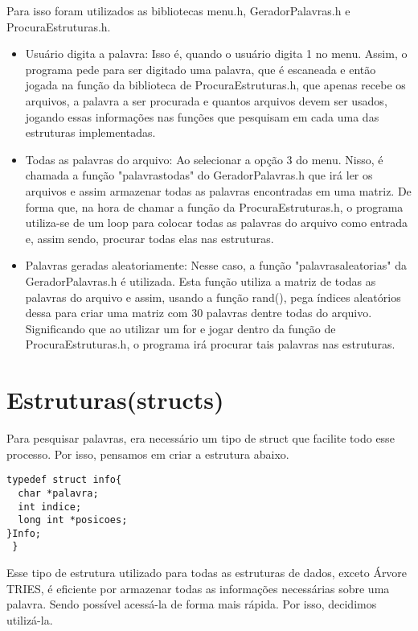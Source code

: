 \documentclass[
	12pt,				%
    oneside,			%
	a4paper,			%
	english,			%
	french,				%
	spanish,			%
	brazil,				%
	]{abntex2}
\begin{document}
Para isso foram utilizados as bibliotecas menu.h, GeradorPalavras.h e ProcuraEstruturas.h.

\begin{itemize}
   \item Usuário digita a palavra: Isso é, quando o usuário digita 1 no menu. Assim, o programa pede para ser digitado uma palavra, que é escaneada e então jogada na função da biblioteca de ProcuraEstruturas.h, que apenas recebe os arquivos, a palavra a ser procurada e quantos arquivos devem ser usados, jogando essas informações nas funções que pesquisam em cada uma das estruturas implementadas.

   \item Todas as palavras do arquivo: Ao selecionar a opção 3 do menu. Nisso, é chamada a função "palavrastodas" do GeradorPalavras.h que irá ler os arquivos e assim armazenar todas as palavras encontradas em uma matriz. De forma que, na hora de chamar a função da ProcuraEstruturas.h, o programa utiliza-se de um loop para colocar todas as palavras do arquivo como entrada e, assim sendo, procurar todas elas nas estruturas.

   \item Palavras geradas aleatoriamente: Nesse caso, a função "palavrasaleatorias" da GeradorPalavras.h é utilizada. Esta função utiliza a matriz de todas as palavras do arquivo e assim, usando a função rand(), pega índices aleatórios dessa para criar uma matriz com 30 palavras dentre todas do arquivo. Significando que ao utilizar um for e jogar dentro da função de ProcuraEstruturas.h, o programa irá procurar tais palavras nas estruturas.

\end{itemize}

\chapter{Estruturas(structs)}
    Para pesquisar palavras, era necessário um tipo de struct que facilite todo esse processo. Por isso, pensamos em criar  a estrutura abaixo.

\begin{lstlisting}
typedef struct info{
  char *palavra;
  int indice;
  long int *posicoes;
}Info;
 } \end{lstlisting}

 Esse tipo de estrutura utilizado para todas as estruturas de dados, exceto Árvore TRIES, é eficiente por armazenar todas as informações necessárias sobre uma palavra. Sendo possível acessá-la de forma mais rápida. Por isso, decidimos utilizá-la.
\end{document}
